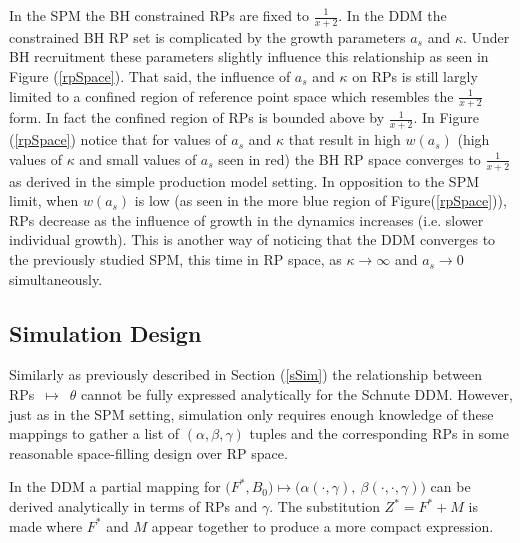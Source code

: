 %
In the SPM the BH constrained RPs are fixed to $\frac{1}{x+2}$.
In the DDM the constrained BH RP set is complicated by the growth parameters 
$a_s$ and $\kappa$. Under BH recruitment these parameters slightly %
influence this relationship as seen in Figure (\ref{rpSpace}). That said,
the influence of $a_s$ and $\kappa$ on RPs is still largly limited to a
confined region of reference point space which resembles the $\frac{1}{x+2}$
form. In fact the confined region of RPs is bounded above by $\frac{1}{x+2}$. %
In Figure (\ref{rpSpace}) notice that for values of $a_s$ and $\kappa$ that
result in high $w(a_s)$ (high values of $\kappa$ and small values of $a_s$ seen
in red) the BH RP space converges to $\frac{1}{x+2}$ as derived in the simple
production model setting. In opposition to the SPM limit, when $w(a_s)$ is low 
(as seen in the more blue region of Figure(\ref{rpSpace})), RPs decrease as 
the influence of growth in the dynamics increases (i.e. slower individual growth). 
This is another way of noticing that the DDM converges to the previously 
studied SPM, this time in RP space, as $\kappa\to\infty$ and $a_s\to0$ 
simultaneously.

%
\subsection{Simulation Design\label{delayDesign}}

%
Similarly as previously described in Section (\ref{sSim}) the relationship
between \mbox{RPs $\mapsto$ $\theta$} cannot be fully expressed analytically for the
Schnute DDM. However, just as in the SPM setting, %
simulation only requires enough knowledge of these mappings to gather a list
of $(\alpha, \beta, \gamma)$ tuples and the corresponding RPs in some reasonable
space-filling design over RP space. %

In the DDM a partial mapping for
$\big(F^*, B_0\big) \mapsto \big(\alpha(\cdot, \gamma), ~\beta(\cdot, \cdot, \gamma)\big)$
can be derived analytically in terms of RPs and $\gamma$. The substitution
$Z^*=F^*+M$ is made where $F^*$ and $M$ appear together to produce a more
compact expression.

